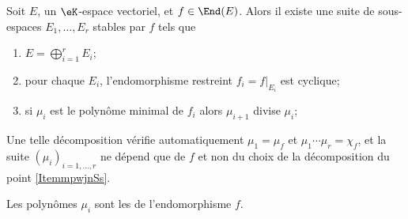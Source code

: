 \begin{theorem}        \label{THOooDOWUooOzxzxm}
    Soit \( E\), un \( \eK\)-espace vectoriel, et \( f\in \End(E)\). Alors il existe une suite de sous-espaces \( E_1,\ldots, E_r\) stables par \( f\) tels que
    \begin{enumerate}
        \item   \label{ItemmpwjnSs}
            \( E=\bigoplus_{i=1}^rE_i\);
        \item
            pour chaque \( E_i\), l'endomorphisme restreint \( f_i=f|_{E_i}\) est cyclique;
        \item
            si \( \mu_i\) est le polynôme minimal de \( f_i\) alors \( \mu_{i+1}\) divise \( \mu_i\);
    \end{enumerate}
    Une telle décomposition vérifie automatiquement \( \mu_1=\mu_f\) et \( \mu_1\cdots \mu_r=\chi_f\), et la suite \( (\mu_i)_{i=1,\ldots, r}\) ne dépend que de \( f\) et non du choix de la décomposition du point \ref{ItemmpwjnSs}.
\end{theorem}

Les polynômes \( \mu_i\) sont les  de l'endomorphisme \( f\).

